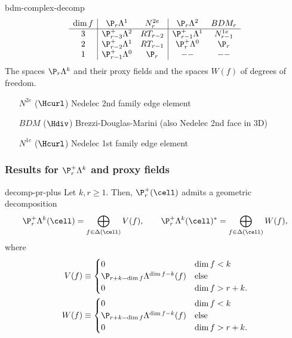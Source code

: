 \begin{Example}{bdm-complex-decomp}
  \begin{gather}
    \begin{array}{c|cc|cc}
      \dim f
      & \P_r\Lambda^1 & N^{2e}_r
      & \P_r\Lambda^2 & BDM_r \\\hline
      3 & \P_{r-3}^+\Lambda^2 & RT_{r-2} & \P_{r-1}^+\Lambda^1 & N^{1e}_{r-1} \\
      2 & \P_{r-2}^+\Lambda^1 & RT_{r-1} & \P_{r}^+\Lambda^0 & \P_r \\
      1 & \P_{r-1}^+\Lambda^0 & \P_r & --& --
    \end{array}
  \end{gather}
  The spaces $\P_r\Lambda^k$ and their proxy fields and the spaces
  $W(f)$ of degrees of freedom.
  
  \begin{itemize}
  \item [$N^{2e}$] ($\Hcurl$) Nedelec 2nd family edge element
  \item [$BDM$] ($\Hdiv$) Brezzi-Douglas-Marini (also Nedelec 2nd face in 3D)
  \item [$N^{1e}$] ($\Hcurl$) Nedelec 1st family edge element
  \end{itemize}
\end{Example}

\subsubsection{Results for $\P_r^+\Lambda^k$ and proxy fields}


\begin{Theorem}{decomp-pr-plus}
  Let $k,r\ge 1$. Then, $\P_r^+(\cell)$ admits a geometric decomposition
  \begin{gather}
    \P_r^+\Lambda^k(\cell) = \bigoplus_{f\in\Delta(\cell)} V(f),
    \qquad
    \P_r^+\Lambda^k(\cell)^* = \bigoplus_{f\in\Delta(\cell)} W(f),
  \end{gather}
  where
  \begin{align}
    V(f) \equiv
    \begin{cases}
      0 & \dim f < k\\
      \P_{r+k-\dim f} \Lambda^{\dim f-k}(f) &\text{else}\\
      0 & \dim f > r+k.
    \end{cases}
    \\
    W(f) \equiv
    \begin{cases}
      0 & \dim f < k\\
      \P_{r+k-\dim f} \Lambda^{\dim f-k}(f) &\text{else}\\
      0 & \dim f > r+k.
    \end{cases}
  \end{align}
\end{Theorem}

